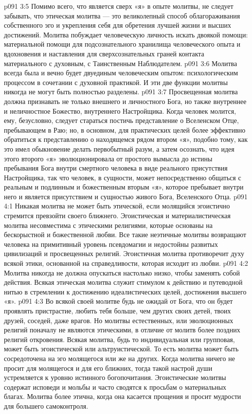 \vs p091 3:5 Помимо всего, что является сверх «я» в опыте молитвы, не следует забывать, что этическая молитва --- это великолепный способ облагораживания собственного эго и укрепления себя для обретения лучшей жизни и высших достижений. Молитва побуждает человеческую личность искать двоякой помощи: материальной помощи для подсознательного хранилища человеческого опыта и вдохновения и наставления для сверхсознательных граней контакта материального с духовным, с Таинственным Наблюдателем.
\vs p091 3:6 Молитва всегда была и вечно будет двуединым человеческим опытом: психологическим процессом в сочетании с духовной практикой. И эти две функции молитвы никогда не могут быть полностью разделены.
\vs p091 3:7 Просвещенная молитва должна признавать не только внешнего и личностного Бога, но также внутреннее и неличностное Божество, внутреннего Настройщика. Когда человек молится, ему, безусловно, следует стараться постичь представление о Вселенском Отце, пребывающем в Раю; но, в основном, для практических целей более эффективно обратиться к представлению о находящемся рядом втором «я», подобно тому, как это имел обыкновение делать первобытный разум, а затем осознать, что идея этого второго «я» эволюционировала от простого вымысла до истины пребывания Бога внутри смертного человека в виде реального присутствия Настройщика, так что человек, в сущности, может непосредственно общаться с реальным и подлинным и божественным вторым «я», которое пребывает внутри него и является присутствием и сущностью живого Бога, Вселенского Отца.
\vs p091 4:1 Никакая молитва не может быть этической, если молящийся эгоистично стремится превзойти своего ближнего. Эгоистическая и материалистическая молитва несовместима с этическими религиями, которые основаны на бескорыстной и божественной любви. Все такие неэтичные молитвы возвращают человека на примитивный уровень псевдомагии и недостойны развитых цивилизаций и просвещенных религий. Эгоистичная молитва противоречит духу всякой этики, основанной на справедливости, которая исходит из любви.
\vs p091 4:2 Молитва никогда не должна опускаться настолько низко, чтобы заменять собой действия. Всякая этическая молитва служит стимулом к действию и путеводной нитью в стремлении к достижению идеалистических целей, достижения высшего «я».
\vs p091 4:3 Во всякой своей молитве будь  не ожидай от Бога, что он будет проявлять пристрастие, любить тебя больше, чем других своих детей, твоих друзей, соседей, даже врагов. Но молитвы естественных, или эволюционных религий поначалу не являются этическими, в отличие от молитв более поздних религий откровения. Всякая молитва, будь то индивидуальная или групповая, может быть эгоистической или альтруистической. То есть молитва может быть сосредоточена на эго молящегося или же на других. Когда молитва ничего не просит для молящегося и для его ближних, тогда такой настрой души устремляется к уровню истинного богопочитания. Эгоистические молитвы содержат исповеди и мольбы и часто сводятся к просьбам о материальных благах. Молитва более этична, когда она касается прощения и просит мудрости для большего самоконтроля.
